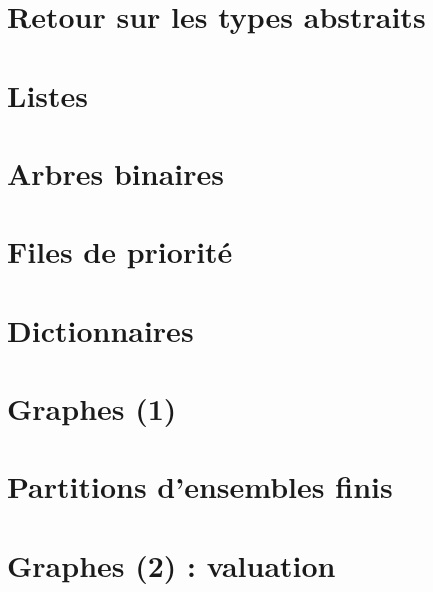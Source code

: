 \documentclass{minitelreport}
\begin{document}
\begin{refsection}
		\section{Retour sur les types abstraits} %
			\label{sec:type_abstrait_de_donn_es}
			
		\newpage
		\section{Listes}
			\label{sec:listes}
			
		\newpage
		\section{Arbres binaires}
			\label{sec:arbres_binaires}
			
		\newpage
		\section{Files de priorité}
			\label{sec:files_de_priorite}
			
		\newpage
		\section{Dictionnaires}
			\label{sec:dictionnaires}
			
		\newpage
		\section{Graphes (1)}
			\label{sec:graphes}
			
		\newpage
		\section{Partitions d'ensembles finis}
			\label{sec:partitions}
			
		\newpage
		\section{Graphes (2) : valuation}
			\label{sec:graphes_values}
			
		\newpage

\end{refsection}
\end{document}
